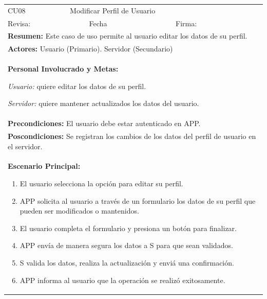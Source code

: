 \begin{longtable}{|l|p{5.5cm}|l|p{2cm}|l|p{1.9cm}|} \hline
    \cellcolor{grisOscuro} CU08 & \multicolumn{4}{|l|}{  \cellcolor{grisOscuro} Modificar Perfil de Usuario} &  \cellcolor{grisClaro}\multirow{2}{1cm}{} \\ \cline{1-5}
    \cellcolor{grisOscuro} Revisa: &  \cellcolor{grisClaro} &  \cellcolor{grisOscuro} Fecha &  \cellcolor{grisClaro} &  \cellcolor{grisOscuro} Firma: & \cellcolor{grisClaro} \\ \hline
    \multicolumn{6}{|p{15cm}|}{ \textbf{Resumen: } Este caso de uso permite al usuario editar los datos de su perfil.

    } \\ \hline

    \multicolumn{6}{|p{15cm}|}{ \textbf{Actores: } Usuario (Primario). Servidor (Secundario)

    } \\ \hline

    \multicolumn{6}{|p{15cm}|}{ \textbf{Personal Involucrado y Metas: }
    
    \emph{Usuario:} quiere editar los datos de su perfil.

    \emph{Servidor:} quiere mantener actualizados los datos del usuario.

    } \\ \hline

    \multicolumn{6}{|p{15cm}|}{ \textbf{Precondiciones: } El usuario debe estar autenticado en APP.

    } \\ \hline

    \multicolumn{6}{|p{15cm}|}{ \textbf{Poscondiciones: } Se registran los cambios de los datos del perfil de usuario en el servidor.

    } \\ \hline

    \multicolumn{6}{|p{15cm}|}{ \textbf{Escenario Principal: }

    \begin{enumerate}
        \item El usuario selecciona la opción para editar su perfil.
        \item APP solicita al usuario a través de un formulario los datos de su perfil que pueden ser modificados o mantenidos.
        \item El usuario completa el formulario y presiona un botón para finalizar.
        \item APP envía de manera segura los datos a S para que sean validados.
        \item S valida los datos, realiza la actualización y enviá una confirmación.
        \item APP informa al usuario que la operación se realizó exitosamente.
    \end{enumerate}

}
\end{longtable}
